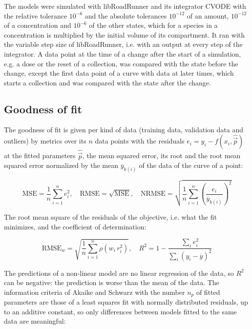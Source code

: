 The models were simulated with libRoadRunner \cite{Welsh2023} and its integrator CVODE \cite{Hindmarsh2005} with the relative tolerance $10^{-6}$ and the absolute tolerances $10^{-12}$ of an amount, $10^{-12}$ of a concentration and $10^{-6}$ of the other states, which for a species in a concentration is multiplied by the initial volume of its compartment. It ran with the variable step size of libRoadRunner, i.e. with an output at every step of the integrator. A data point at the time of a change after the start of a simulation, e.g. a dose or the reset of a collection, was compared with the state before the change, except the first data point of a curve with data at later times, which starts a collection and was compared with the state after the change.

\subsection{Goodness of fit}

The goodness of fit is given per kind of data (training data, validation data and outliers) by metrics over its $n$ data points with the residuals $e_i = y_i - f(x_i, \hat{\vec{p}})$ at the fitted parameters $\hat{\vec{p}}$, the mean squared error, its root and the root mean squared error normalized by the mean $\overline{y}_{k(i)}$ of the data of the curve of a point:

\begin{equation}
\mathrm{MSE} = \frac{1}{n} \sum_{i=1}^{n} e_i^2, \quad \mathrm{RMSE} = \sqrt{\mathrm{MSE}}, \quad \mathrm{NRMSE} = \sqrt{\frac{1}{n} \sum_{i=1}^{n} \left(\frac{e_i}{\overline{y}_{k(i)}}\right)^2}
\end{equation}

The root mean square of the residuals of the objective, i.e. what the fit minimizes, and the coefficient of determination:

\begin{equation}
\mathrm{RMSE}_w = \sqrt{\frac{1}{n} \sum_{i=1}^{n} \rho\left(w_i\, r_i^2\right)}, \quad R^2 = 1 - \frac{\sum_{i} e_i^2}{\sum_{i} \left(y_i - \overline{y}\right)^2}
\end{equation}

The predictions of a non-linear model are no linear regression of the data, so $R^2$ can be negative: the prediction is worse than the mean of the data. The information criteria of Akaike \cite{Akaike1974} and Schwarz \cite{Schwarz1978} with the number $n_p$ of fitted parameters are those of a least squares fit with normally distributed residuals, up to an additive constant, so only differences between models fitted to the same data are meaningful:

